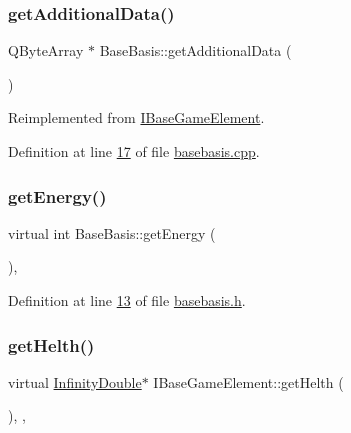 \subsubsection{\texorpdfstring{get\+Additional\+Data()}{getAdditionalData()}}
{\footnotesize\ttfamily Q\+Byte\+Array $\ast$ Base\+Basis\+::get\+Additional\+Data (\begin{DoxyParamCaption}{ }\end{DoxyParamCaption})\hspace{0.3cm}{\ttfamily [virtual]}}



Reimplemented from \hyperlink{a00137_aaf3cdf5f4e893704c9f17c524a1f0a8c}{I\+Base\+Game\+Element}.



Definition at line \hyperlink{a00026_source_l00017}{17} of file \hyperlink{a00026_source}{basebasis.\+cpp}.

\mbox{\label{a00149_acdc9310424ab117e3490e032028a2a7d}} 
\subsubsection{\texorpdfstring{get\+Energy()}{getEnergy()}}
{\footnotesize\ttfamily virtual int Base\+Basis\+::get\+Energy (\begin{DoxyParamCaption}{ }\end{DoxyParamCaption})\hspace{0.3cm}{\ttfamily [inline]}, {\ttfamily [virtual]}}



Definition at line \hyperlink{a00029_source_l00013}{13} of file \hyperlink{a00029_source}{basebasis.\+h}.

\mbox{\label{a00137_a13a00e39ece3e20e3f5e049224da8d40}} 
\subsubsection{\texorpdfstring{get\+Helth()}{getHelth()}}
{\footnotesize\ttfamily virtual \hyperlink{a00161}{Infinity\+Double}$\ast$ I\+Base\+Game\+Element\+::get\+Helth (\begin{DoxyParamCaption}{ }\end{DoxyParamCaption})\hspace{0.3cm}{\ttfamily [inline]}, {\ttfamily [virtual]}, {\ttfamily [inherited]}}



